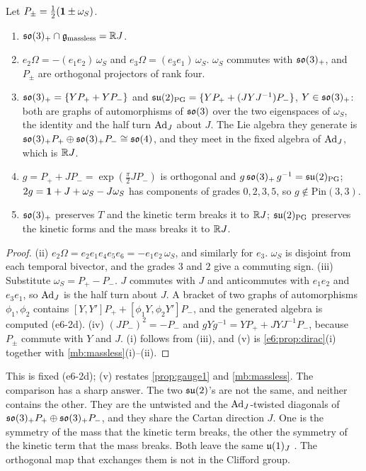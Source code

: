 \begin{proposition}
\label{e6:prop:twosu2}
Let $P_\pm=\tfrac12(\mathbf 1\pm\omega_S)$.
\begin{enumerate}[label=(\roman*),leftmargin=2.2em]
\item $\mathfrak{so}(3)_+\cap\mathfrak g_{\rm massless}=\mathbb{R} J$.
\item $e_2\Omega=-(e_1e_2)\,\omega_S$ and $e_3\Omega=(e_3e_1)\,\omega_S$. $\omega_S$ commutes with $\mathfrak{so}(3)_+$, and $P_\pm$ are orthogonal projectors of rank four.
\item $\mathfrak{so}(3)_+=\{YP_++YP_-\}$ and $\mathfrak{su}(2)_{\rm PG}=\{YP_++(JYJ^{-1})P_-\}$, $Y\in\mathfrak{so}(3)_+$: both are graphs of automorphisms of $\mathfrak{so}(3)$ over the two
eigenspaces of $\omega_S$, the identity and the half turn $\operatorname{Ad}_J$ about $J$. The Lie algebra they generate is $\mathfrak{so}(3)_+P_+\oplus\mathfrak{so}(3)_+P_-\cong\mathfrak{so}(4)$, and they
meet in the fixed algebra of $\operatorname{Ad}_J$, which is $\mathbb{R} J$.
\item $g=P_++JP_-=\exp(\tfrac\pi2JP_-)$ is orthogonal and $g\,\mathfrak{so}(3)_+\,g^{-1}=\mathfrak{su}(2)_{\rm PG}$; $2g=\mathbf 1+J+\omega_S-J\omega_S$ has components of grades $0,2,3,5$,
so $g\notin\mathrm{Pin}(3,3)$.
\item $\mathfrak{so}(3)_+$ preserves $T$ and the kinetic term breaks it to $\mathbb{R} J$; $\mathfrak{su}(2)_{\rm PG}$ preserves the kinetic forms and the mass breaks it to $\mathbb{R} J$.
\end{enumerate}
\end{proposition}

\begin{proof}
(ii) $e_2\Omega=e_2e_1e_4e_5e_6=-e_1e_2\,\omega_S$, and similarly for $e_3$. $\omega_S$ is disjoint from each temporal bivector, and the grades $3$ and $2$
give a commuting sign. (iii) Substitute $\omega_S=P_+-P_-$. $J$ commutes with $J$ and anticommutes with $e_1e_2$ and $e_3e_1$, so
$\operatorname{Ad}_J$ is the half turn about $J$. A bracket of two graphs of automorphisms $\phi_1,\phi_2$ contains $[Y,Y']P_++[\phi_1Y,\phi_2Y']P_-$, and the
generated algebra is computed (e6-2d). (iv) $(JP_-)^2=-P_-$ and $gYg^{-1}=YP_++JYJ^{-1}P_-$, because $P_\pm$ commute with $Y$ and $J$. (i) follows from (iii),
and (v) is \cref{e6:prop:dirac}(i) together with \cref{mb:massless}(i)--(ii).
\end{proof}

This is fixed (e6-2d); (v) restates \cref{prop:gauge1} and \cref{mb:massless}. The comparison has a sharp answer.
The two $\mathfrak{su}(2)$'s are not the same, and neither contains the other. They are the untwisted and the $\operatorname{Ad}_J$-twisted diagonals of $\mathfrak{so}(3)_+P_+\oplus\mathfrak{so}(3)_+P_-$,
and they share the Cartan direction $J$. One is the symmetry of the mass that the kinetic term breaks, the other the symmetry of the kinetic term
that the mass breaks. Both leave the same $\mathfrak{u}(1)_J$ \cite{Pauli57,Gursey58}. The orthogonal map that exchanges them is not in the Clifford group.

